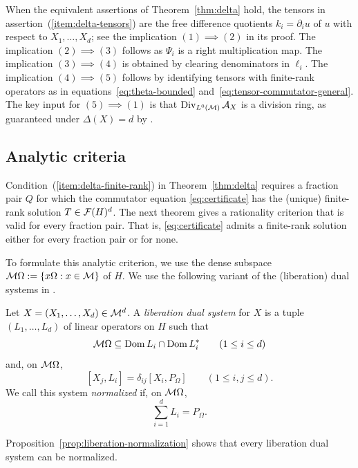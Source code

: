 \begin{remark}
When the equivalent assertions of Theorem~\ref{thm:delta} hold, the tensors in assertion~\textup{(\ref{item:delta-tensors})} are the free difference quotients $k_i=\partial_i u$ of $u$ with respect to $X_1,\ldots,X_d$;
see the implication $(1)\implies(2)$ in its proof.
The implication $(2)\implies(3)$ follows as $\Psi_i$ is a right multiplication map.
The implication $(3)\implies(4)$ is obtained by clearing denominators in $\ell_i$.
The implication $(4)\implies(5)$ follows by identifying tensors with finite-rank operators as in equations~\eqref{eq:theta-bounded} and~\eqref{eq:tensor-commutator-general}.
The key input for $(5)\implies(1)$ is that $\operatorname{Div}_{L^0(\mathcal M)}\mathcal A_X$ is a division ring, as guaranteed under $\Delta(X)=d$ by \cite[Theorem~1.1]{MSY23}.
\end{remark}

\subsection{Analytic criteria}
Condition~\textup{(\ref{item:delta-finite-rank})} in Theorem~\ref{thm:delta} requires a fraction pair $Q$ for which the commutator equation \eqref{eq:certificate} has the (unique) finite-rank solution $T\in\mathcal F(H)^d$.
The next theorem gives a rationality criterion that is valid for every fraction pair.
That is, \eqref{eq:certificate} admits a finite-rank solution either for every fraction pair or for none.

To formulate this analytic criterion, we use the dense subspace $\mathcal M\Omega:=\{x\Omega:x\in\mathcal M\}$ of $H$.
We use the following variant of the (liberation) dual systems in \cite[Definition~13.1]{Voi99}.
\begin{definition}\label{def:liberation-dual-system}
Let $X=(X_1,\ldots,X_d)\in\mathcal M^d$.
A \emph{liberation dual system} for $X$ is a tuple $(L_1,\ldots,L_d)$ of linear operators on $H$ such that
\[
 \mathcal M\Omega\subseteq\operatorname{Dom} L_i\cap\operatorname{Dom} L_i^*
 \qquad(1\leq i\leq d)
\]
and, on $\mathcal M\Omega$,
\[
 [X_j,L_i]=\delta_{ij}[X_i,P_\Omega]
 \qquad(1\leq i,j\leq d).
\]
We call this system \emph{normalized} if, on $\mathcal M\Omega$,
\begin{equation}\label{eq:liberation-normalization}
 \sum_{i=1}^dL_i=P_\Omega.
\end{equation}
\end{definition}
Proposition~\ref{prop:liberation-normalization} shows that every liberation dual system can be normalized.


